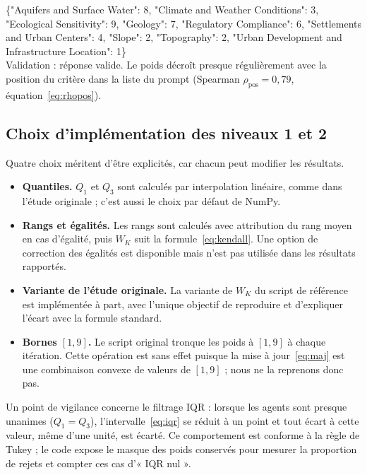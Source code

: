 \documentclass[11pt,a4paper]{article}
\newcommand{\code}[1]{\texttt{#1}}
\begin{document}
\begin{tcolorbox}[colback=gin!5, colframe=gin!70, boxrule=0.5pt, arc=2pt, left=6pt, right=6pt, top=4pt, bottom=4pt,
  title={\small Exemple de réponse brute (\code{llama3.1:8b}, profil ENR, agent 0, essai 0, graine 0, température 0,7)}, fonttitle=\bfseries]
\scriptsize\ttfamily
\{"Aquifers and Surface Water": 8, "Climate and Weather Conditions": 3, "Ecological Sensitivity": 9, "Geology": 7, "Regulatory Compliance": 6, "Settlements and Urban Centers": 4, "Slope": 2, "Topography": 2, "Urban Development and Infrastructure Location": 1\}\\[2pt]
\normalfont\footnotesize
Validation : réponse valide. Le poids décroît presque régulièrement avec la position du critère dans la liste du prompt (Spearman $\rho_{\mathrm{pos}}=0{,}79$, équation~\eqref{eq:rhopos}).
\end{tcolorbox}

\subsection{Choix d'implémentation des niveaux 1 et 2}

Quatre choix méritent d'être explicités, car chacun peut modifier les résultats.
\begin{itemize}
  \item \textbf{Quantiles.} $Q_1$ et $Q_3$ sont calculés par interpolation linéaire, comme dans l'étude originale ; c'est aussi le choix par défaut de NumPy.
  \item \textbf{Rangs et égalités.} Les rangs sont calculés avec attribution du rang moyen en cas d'égalité, puis $W_K$ suit la formule~\eqref{eq:kendall}. Une option de correction des égalités est disponible mais n'est pas utilisée dans les résultats rapportés.
  \item \textbf{Variante de l'étude originale.} La variante de $W_K$ du script de référence est implémentée à part, avec l'unique objectif de reproduire et d'expliquer l'écart avec la formule standard.
  \item \textbf{Bornes $[1,9]$.} Le script original tronque les poids à $[1,9]$ à chaque itération. Cette opération est sans effet puisque la mise à jour~\eqref{eq:maj} est une combinaison convexe de valeurs de $[1,9]$ ; nous ne la reprenons donc pas.
\end{itemize}
Un point de vigilance concerne le filtrage IQR : lorsque les agents sont presque unanimes ($Q_1=Q_3$), l'intervalle~\eqref{eq:iqr} se réduit à un point et tout écart à cette valeur, même d'une unité, est écarté. Ce comportement est conforme à la règle de Tukey ; le code expose le masque des poids conservés pour mesurer la proportion de rejets et compter ces cas d'« IQR nul ».
\end{document}
